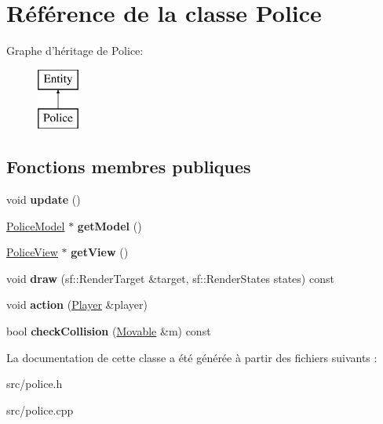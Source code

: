 \hypertarget{class_police}{\section{Référence de la classe Police}
\label{class_police}
}
Graphe d'héritage de Police\+:\begin{figure}[H]
\begin{center}
\leavevmode
\includegraphics[height=2.000000cm]{class_police}
\end{center}
\end{figure}
\subsection*{Fonctions membres publiques}
\begin{DoxyCompactItemize}
\item 
\hypertarget{class_police_a09b4453c546a520ed07039b170ec80cb}{void {\bfseries update} ()}\label{class_police_a09b4453c546a520ed07039b170ec80cb}

\item 
\hypertarget{class_police_af2c74f2ce4a9091fcfe1f60579742204}{\hyperlink{class_police_model}{Police\+Model} $\ast$ {\bfseries get\+Model} ()}\label{class_police_af2c74f2ce4a9091fcfe1f60579742204}

\item 
\hypertarget{class_police_afe99f2416c65a67cfc992ed34420b168}{\hyperlink{class_police_view}{Police\+View} $\ast$ {\bfseries get\+View} ()}\label{class_police_afe99f2416c65a67cfc992ed34420b168}

\item 
\hypertarget{class_police_aa8ba00a480579f54c0f151d4f07bf83d}{void {\bfseries draw} (sf\+::\+Render\+Target \&target, sf\+::\+Render\+States states) const }\label{class_police_aa8ba00a480579f54c0f151d4f07bf83d}

\item 
\hypertarget{class_police_a27bb6169c1a15453bff28321e7496547}{void {\bfseries action} (\hyperlink{class_player}{Player} \&player)}\label{class_police_a27bb6169c1a15453bff28321e7496547}

\item 
\hypertarget{class_police_a35a3111c98aef8b31b08541ed9e67290}{bool {\bfseries check\+Collision} (\hyperlink{class_movable}{Movable} \&m) const }\label{class_police_a35a3111c98aef8b31b08541ed9e67290}

\end{DoxyCompactItemize}


La documentation de cette classe a été générée à partir des fichiers suivants \+:\begin{DoxyCompactItemize}
\item 
src/police.\+h\item 
src/police.\+cpp\end{DoxyCompactItemize}
